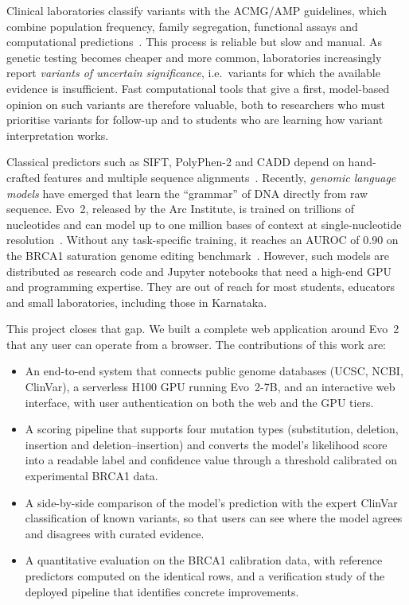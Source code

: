 \documentclass[conference,a4paper]{IEEEtran}
\begin{document}
Clinical laboratories classify variants with the ACMG/AMP guidelines, which combine population frequency, family segregation, functional assays and computational predictions~\cite{richards2015acmg}. This process is reliable but slow and manual. As genetic testing becomes cheaper and more common, laboratories increasingly report \emph{variants of uncertain significance}, i.e.\ variants for which the available evidence is insufficient. Fast computational tools that give a first, model-based opinion on such variants are therefore valuable, both to researchers who must prioritise variants for follow-up and to students who are learning how variant interpretation works.

Classical predictors such as SIFT, PolyPhen-2 and CADD depend on hand-crafted features and multiple sequence alignments~\cite{ng2001sift,adzhubei2010polyphen2,rentzsch2019cadd}. Recently, \emph{genomic language models} have emerged that learn the ``grammar'' of DNA directly from raw sequence. Evo~2, released by the Arc Institute, is trained on trillions of nucleotides and can model up to one million bases of context at single-nucleotide resolution~\cite{brixi2026evo2}. Without any task-specific training, it reaches an AUROC of 0.90 on the BRCA1 saturation genome editing benchmark~\cite{brixi2026evo2}. However, such models are distributed as research code and Jupyter notebooks that need a high-end GPU and programming expertise. They are out of reach for most students, educators and small laboratories, including those in Karnataka.

This project closes that gap. We built a complete web application around Evo~2 that any user can operate from a browser. The contributions of this work are:

\begin{itemize}
\item An end-to-end system that connects public genome databases (UCSC, NCBI, ClinVar), a serverless H100 GPU running Evo~2-7B, and an interactive web interface, with user authentication on both the web and the GPU tiers.
\item A scoring pipeline that supports four mutation types (substitution, deletion, insertion and deletion--insertion) and converts the model's likelihood score into a readable label and confidence value through a threshold calibrated on experimental BRCA1 data.
\item A side-by-side comparison of the model's prediction with the expert ClinVar classification of known variants, so that users can see where the model agrees and disagrees with curated evidence.
\item A quantitative evaluation on the BRCA1 calibration data, with reference predictors computed on the identical rows, and a verification study of the deployed pipeline that identifies concrete improvements.
\end{itemize}
\end{document}

